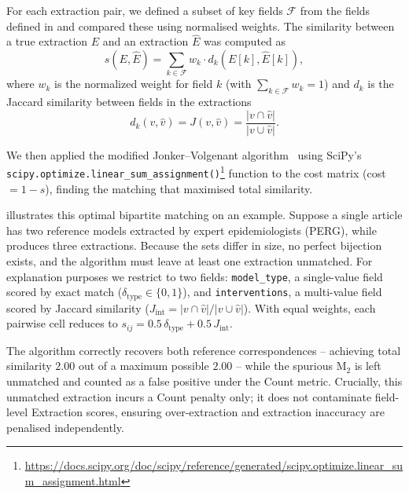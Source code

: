 For each extraction pair, we defined a subset of key fields $\mathcal{F}$ from the fields defined in  and compared these using normalised weights. The similarity between a true extraction $E$ and an \name{} extraction $\hat{E}$ was computed as
\begin{equation*}
s(E, \hat{E}) = \sum_{k \in \mathcal{F}} w_k \cdot d_k(E[k], \hat{E}[k]),
\end{equation*}
where $w_k$ is the normalized weight for field $k$ (with $\sum_{k \in \mathcal{F}} w_k = 1$) and $d_k$ is the Jaccard similarity between fields in the extractions
\begin{equation*}
d_k(v, \hat{v}) = J(v, \hat{v}) = \dfrac{|v \cap \hat{v}|}{|v \cup \hat{v}|}.
\end{equation*}

We then applied the modified Jonker--Volgenant algorithm~\citep{jonker1987shortest} using SciPy's \texttt{scipy.optimize.linear\_sum\_assignment()}\footnote{\url{https://docs.scipy.org/doc/scipy/reference/generated/scipy.optimize.linear_sum_assignment.html}} function to the cost matrix (cost $= 1 - s$), finding the matching that maximised total similarity. 

 illustrates this optimal bipartite matching on an example. Suppose a single article has two reference models extracted by expert epidemiologists (PERG), while \name{} produces three extractions. Because the sets differ in size, no perfect bijection exists, and the algorithm must leave at least one \name{} extraction unmatched. For explanation purposes we restrict to two fields: \texttt{model\_type}, a single-value field scored by exact match ($\delta_{\mathrm{type}}\in\{0,1\}$), and \texttt{interventions}, a multi-value field scored by Jaccard similarity ($J_{\mathrm{int}} = |v\cap\hat{v}|/|v\cup\hat{v}|$). With equal weights, each pairwise cell reduces to $s_{ij} = 0.5\,\delta_{\mathrm{type}} + 0.5\,J_{\mathrm{int}}$. 

The algorithm correctly recovers both reference correspondences -- achieving total similarity $2.00$ out of a maximum possible $2.00$ -- while the spurious \name{} M$_2$ is left unmatched and counted as a false positive under the Count metric. Crucially, this unmatched extraction incurs a Count penalty only; it does not contaminate field-level Extraction scores, ensuring over-extraction and extraction inaccuracy are penalised independently.

